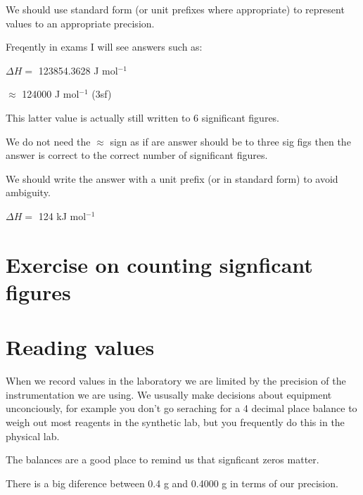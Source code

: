 \documentclass[
  letterpaper,
  DIV=11,
  numbers=noendperiod]{scrreprt}
\begin{document}
We should use standard form (or unit prefixes where appropriate) to
represent values to an appropriate precision.

\begin{tcolorbox}[enhanced jigsaw, arc=.35mm, bottomrule=.15mm, bottomtitle=1mm, breakable, colback=white, colbacktitle=quarto-callout-important-color!10!white, colframe=quarto-callout-important-color-frame, coltitle=black, left=2mm, leftrule=.75mm, opacityback=0, opacitybacktitle=0.6, rightrule=.15mm, title=\textcolor{quarto-callout-important-color}{\faExclamation}\hspace{0.5em}{Don't do this!}, titlerule=0mm, toprule=.15mm, toptitle=1mm]

Freqently in exams I will see answers such as:

\(\Delta H =\) 123854.3628 J mol\(^{-1}\)

\(\approx\) 124000 J mol\(^{-1}\) (3sf)

This latter value is actually still written to 6 significant figures.

We do not need the \(\approx\) sign as if are answer should be to three
sig figs then the answer is correct to the correct number of significant
figures.

We should write the answer with a unit prefix (or in standard form) to
avoid ambiguity.

\(\Delta H =\) 124 kJ mol\(^{-1}\)

\end{tcolorbox}

\section{Exercise on counting signficant figures}\label{sec-exercise-sf}

\section{Reading values}\label{sec-readingvalues}

When we record values in the laboratory we are limited by the precision
of the instrumentation we are using. We ususally make decisions about
equipment unconciously, for example you don't go seraching for a 4
decimal place balance to weigh out most reagents in the synthetic lab,
but you frequently do this in the physical lab.

The balances are a good place to remind us that signficant zeros matter.

There is a big diference between 0.4 g and 0.4000 g in terms of our
precision.
\end{document}
